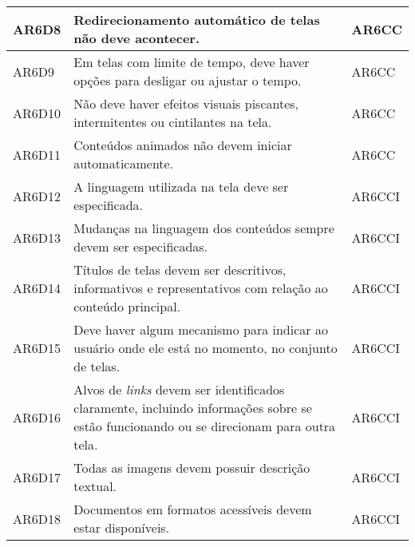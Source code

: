 \begin{table}[htb]
\begin{center}
\begin{tabular}{p{1.2cm}|p{12.0cm}|p{1.5cm}}
      \hline
      AR6D8           & Redirecionamento automático de telas não deve acontecer.                                                                                     & AR6CC              \\
      \hline
      AR6D9           & Em telas com limite de tempo, deve haver opções para desligar ou ajustar o tempo.                                                            & AR6CC              \\
      \hline
      AR6D10          & Não deve haver efeitos visuais piscantes, intermitentes ou cintilantes na tela.                                                              & AR6CC              \\
      \hline
      AR6D11          & Conteúdos animados não devem iniciar automaticamente.                                                                                        & AR6CC              \\
      \hline
      AR6D12          & A linguagem utilizada na tela deve ser especificada.                                                                                         & AR6CCI             \\
      \hline
      AR6D13          & Mudanças na linguagem dos conteúdos sempre devem ser especificadas.                                                                          & AR6CCI             \\
      \hline
      AR6D14          & Títulos de telas devem ser descritivos, informativos e representativos com relação ao conteúdo principal.                                    & AR6CCI             \\
      \hline
      AR6D15          & Deve haver algum mecanismo para indicar ao usuário onde ele está no momento, no conjunto de telas.                                           & AR6CCI             \\
      \hline
      AR6D16          & Alvos de \emph{links} devem ser identificados claramente, incluindo informações sobre se estão funcionando ou se direcionam para outra tela. & AR6CCI             \\
      \hline
      AR6D17          & Todas as imagens devem possuir descrição textual.                                                                                            & AR6CCI             \\
      \hline
      AR6D18          & Documentos em formatos acessíveis devem estar disponíveis.                                                                                   & AR6CCI             \\

\end{tabular}
\end{center}
\end{table}
